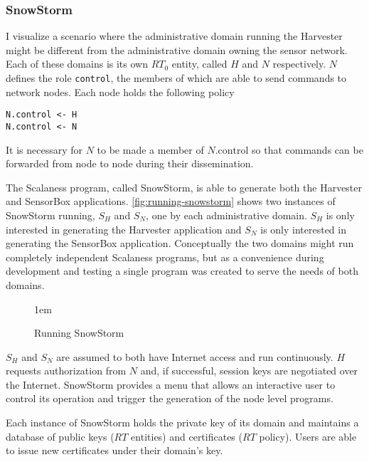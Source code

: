 \subsubsection{SnowStorm}

I visualize a scenario where the administrative domain running the Harvester might be different
from the administrative domain owning the sensor network. Each of these domains is its own
$RT_0$ entity, called $H$ and $N$ respectively. $N$ defines the role \texttt{control}, the
members of which are able to send commands to network nodes. Each node holds the following
policy
\begin{Verbatim}
N.control <- H
N.control <- N
\end{Verbatim}

It is necessary for $N$ to be made a member of $N.\textrm{control}$ so that commands can be
forwarded from node to node during their dissemination. 

The Scalaness program, called SnowStorm, is able to generate both the Harvester and SensorBox
applications. \autoref{fig:running-snowstorm} shows two instances of SnowStorm running, $S_H$
and $S_N$, one by each administrative domain. $S_H$ is only interested in generating the
Harvester application and $S_N$ is only interested in generating the SensorBox application.
Conceptually the two domains might run completely independent Scalaness programs, but as a
convenience during development and testing a single program was created to serve the needs of
both domains.

\begin{figure}[htbp]
  
  \centerline{\raise 1em\box\graph}
  \caption{Running SnowStorm}
  \label{fig:running-snowstorm}
\end{figure}

$S_H$ and $S_N$ are assumed to both have Internet access and run continuously. $H$ requests
authorization from $N$ and, if successful, session keys are negotiated over the Internet.
SnowStorm provides a menu that allows an interactive user to control its operation and trigger
the generation of the node level programs.

Each instance of SnowStorm holds the private key of its domain and maintains a database of
public keys ($RT$ entities) and certificates ($RT$ policy). Users are able to issue new
certificates under their domain's key.

